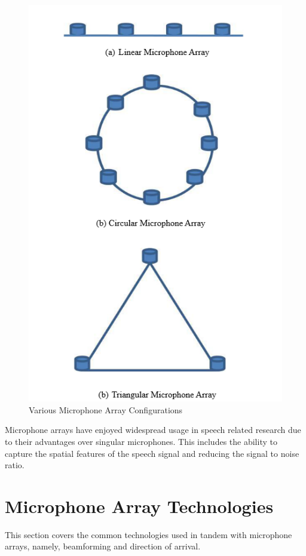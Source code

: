 \documentclass[hidelinks,12pt]{report} %
\begin{document}
\begin{figure}[h]
\centering
\includegraphics[scale = 1.0]{fig2.1} 
\caption{Various Microphone Array Configurations}
\label{fig}
\end{figure}


Microphone arrays have enjoyed widespread usage in speech related research due to their advantages over singular microphones. This includes the ability to capture the spatial features of the speech signal and reducing the signal to noise ratio\cite{4}.    

\section{Microphone Array Technologies}

This section covers the common technologies used in tandem with microphone arrays, namely, beamforming and direction of arrival. 
\end{document}
